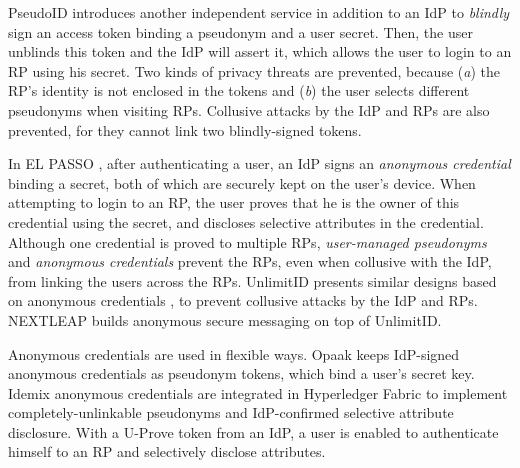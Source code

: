 PseudoID \cite{PseudoID} introduces another independent service in addition to an IdP to \emph{blindly} sign \cite{blind-sign}
    an access token binding a pseudonym and a user secret.
Then, the user unblinds this token and the IdP will assert it,
    which allows the user to login to an RP using his secret.
Two kinds of privacy threats are prevented, because (\emph{a}) the RP's identity is not enclosed in the tokens
    and (\emph{b}) the user selects different pseudonyms when visiting RPs.
Collusive attacks by the IdP and RPs are also prevented,
    for they cannot link two blindly-signed tokens.




In EL PASSO \cite{ELPASSO}, after authenticating a user,
    an IdP signs an \emph{anonymous credential} \cite{anon-credential} binding a secret,
         both of which are securely kept on the user's device.
When attempting to login to an RP,
    the user proves that he is the owner of this credential using the secret,
        and discloses selective attributes in the credential.
Although one credential is proved to multiple RPs,
        \emph{user-managed pseudonyms} and \emph{anonymous credentials} prevent the RPs, even when collusive with the IdP, from linking the users across the RPs.
UnlimitID \cite{UnlimitID} presents similar designs based on anonymous credentials \cite{anon-credential},
        to prevent collusive attacks by the IdP and RPs.
NEXTLEAP \cite{nextleap} builds anonymous secure messaging on top of UnlimitID.


Anonymous credentials \cite{anon-credential-2001,anon-credential} are used in flexible ways.
Opaak \cite{Opaak} keeps IdP-signed anonymous credentials %
 as pseudonym tokens,
    which bind a user's secret key.
Idemix anonymous credentials \cite{idemix}
 are integrated in Hyperledger Fabric \cite{hyperledge-idemix} to implement completely-unlinkable pseudonyms
        and IdP-confirmed selective attribute disclosure.
With a U-Prove token \cite{uprov,uprove-conference} from an IdP,
    a user is enabled to authenticate himself to an RP and selectively disclose attributes.

